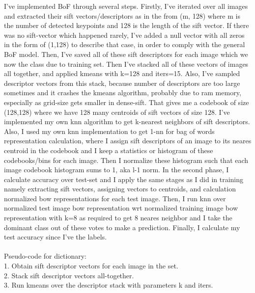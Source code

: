 \documentclass[12pt]{article}
\begin{document}
    \begin{center}
        \raggedright
        I've implemented BoF through several steps. Firstly, I've iterated over all images and extracted their sift vectors/descriptors as in the from (m, 128) where m is the number of detected keypoints and 128 is the length of the sift vector.
        If there was no sift-vector which happened rarely, I've added a null vector with all zeros in the form of (1,128) to describe that case, in order to comply with the general BoF model.
        Then, I've saved all of these sift descriptors for each image which we now the class due to training set. Then I've stacked all of these vectors of images all together, and applied kmeans with k=128 and iters=15.
        Also, I've sampled descriptor vectors from this stack, because number of descriptors are too large sometimes and it crashes the kmeans algorithm, probably due to ram memory, especially as grid-size gets smaller in dense-sift.
        That gives me a codebook of size (128,128) where we have 128 many centroids of sift vectors of size 128.
        I've implemented my own knn algorithm to get k-nearest neighbors of sift descriptors.
        Also, I used my own knn implementation to get 1-nn for bag of words representation calculation, where I assign sift descriptors of an image to its neares centroid in the codebook 
        and I keep a statistics or histogram of these codebooks/bins for each image.
        Then I normalize these histogram such that each image codebook histogram sums to 1, aka l-1 norm.
        In the second phase, I calculate accuracy over test-set and I apply the same stages as I did in training namely
        extracting sift vectors, assigning vectors to centroids, and calculation normalized bow representations for each test image.
        Then, I run knn over normalized test image bow representation wrt normalized training image bow representation with k=8 as required to get 8 neares neighbor 
        and I take the dominant class out of these votes to make a prediction. Finally, I calculate my test accuracy since I've the labels.
        \\~\\
        Pseudo-code for dictionary: \\
        1. Obtain sift descriptor vectors for each image in the set. \\
        2. Stack sift descriptor vectors all-together. \\
        3. Run kmeans over the descriptor stack with parameters k and iters. \\

\end{center}
\end{document}
